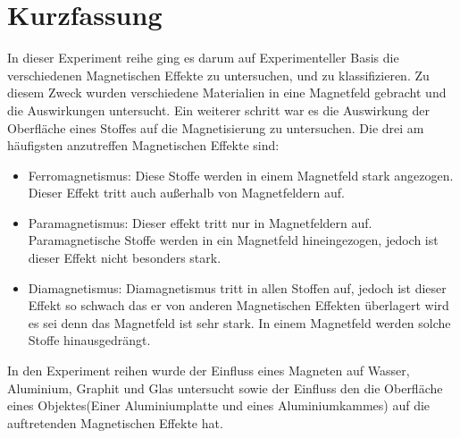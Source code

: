 \section{Kurzfassung}
In dieser Experiment reihe ging es darum auf Experimenteller Basis die verschiedenen Magnetischen Effekte zu untersuchen,
und zu klassifizieren. Zu diesem Zweck wurden verschiedene Materialien in eine Magnetfeld gebracht und die Auswirkungen untersucht. 
Ein weiterer schritt war es die Auswirkung der Oberfläche eines Stoffes auf die Magnetisierung zu untersuchen.
Die drei am häufigsten anzutreffen Magnetischen Effekte sind:
\begin{itemize}
	\item Ferromagnetismus: Diese Stoffe werden in einem Magnetfeld stark angezogen.
	Dieser Effekt tritt auch außerhalb von Magnetfeldern auf.
	\item Paramagnetismus: Dieser effekt tritt nur in Magnetfeldern auf. Paramagnetische Stoffe werden in ein Magnetfeld hineingezogen, jedoch ist dieser Effekt nicht besonders stark.
	\item Diamagnetismus: Diamagnetismus tritt in allen Stoffen auf, jedoch ist dieser Effekt so schwach das er von anderen Magnetischen Effekten überlagert wird es sei denn das Magnetfeld ist sehr stark.
	In einem Magnetfeld werden solche Stoffe hinausgedrängt.
\end{itemize}
In den Experiment reihen wurde der Einfluss eines Magneten auf Wasser, Aluminium, Graphit und Glas untersucht sowie der Einfluss den die Oberfläche eines Objektes(Einer Aluminiumplatte und eines Aluminiumkammes) auf
die auftretenden Magnetischen Effekte hat.